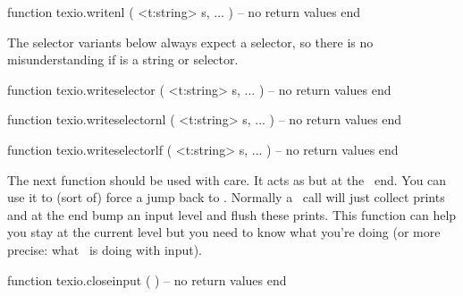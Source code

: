 \starttyping[option=LUA]
function texio.writenl ( <t:string> s, ... )
    -- no return values
end
\stoptyping

The selector variants below always expect a selector, so there is no
misunderstanding if  is a string or selector.

\starttyping[option=LUA]
function texio.writeselector ( <t:string> s, ... )
    -- no return values
end

function texio.writeselectornl ( <t:string> s, ... )
    -- no return values
end

function texio.writeselectorlf ( <t:string> s, ... )
    -- no return values
end
\stoptyping

The next function should be used with care. It acts as \type {\endinput} but at
the \LUA\ end. You can use it to (sort of) force a jump back to \TEX. Normally a
\LUA\ call will just collect prints and at the end bump an input level and flush
these prints. This function can help you stay at the current level but you need
to know what you're doing (or more precise: what \TEX\ is doing with input).

\starttyping[option=LUA]
function texio.closeinput ( )
    -- no return values
end
\stoptyping

%

\stopsection

\stopdocument

